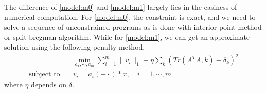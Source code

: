 \documentclass[a4paper]{article}
\begin{document}
The difference of \eqref{model:m0} and \eqref{model:m1} largely lies in the easiness of numerical computation. For \eqref{model:m0}, the constraint is exact, and we need to solve a sequence of unconstrained programs as is done with interior-point method or split-bregman algorithm. While for \eqref{model:m1}, we can get an approximate solution using the  following penalty method. 
\[
\begin{aligned}
	&\min_{a_1,\cdots,a_m} \sum_{i=1}^m \|v_i\|_1 + \eta \sum_k (Tr(A^TA,k)-\delta_k)^2 \\
	\textrm{subject to} \quad &v_i = a_i(-\cdot)*x,\quad i=1,\cdots,m
\end{aligned}
\]
where $\eta$ depends on $\delta$.
%	
\end{document}
